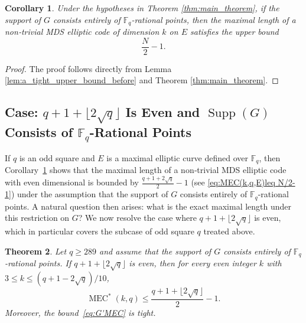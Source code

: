 \documentclass[journal,12pt,onecolumn]{IEEEtran}
\newtheorem{theorem}{Theorem}
\newtheorem{corollary}[theorem]{Corollary}
\begin{document}
\begin{corollary}\label{cor:evenE(Fq)}
    Under the hypotheses in Theorem \ref{thm:main_theorem}, if the support of $G$ consists entirely of $\mathbb{F}_q$-rational points, then the maximal length of a non‑trivial MDS elliptic code of dimension $k$ on $E$ satisfies the upper bound
    \begin{equation}\label{eq:MEC(k,q,E)leq N/2-1}
          \frac{N}{2} - 1.
    \end{equation}
\end{corollary}

\begin{proof}
    The proof follows directly from Lemma \ref{lem:a_tight_upper_bound_before} and Theorem \ref{thm:main_theorem}.
\end{proof}

\subsection{Case: $q+1+ \lfloor 2\sqrt{q} \rfloor$ Is Even and $\operatorname{Supp}(G)$ Consists of $\mathbb{F}_q$-Rational Points}


If $q$ is an odd square and $E$ is a maximal elliptic curve defined over $\mathbb{F}_q$, then Corollary~\ref{cor:evenE(Fq)} shows that the maximal length of a non‑trivial MDS elliptic code with even dimensional is bounded by $\frac{q+1+2\sqrt{q}}{2}-1$ (see \eqref{eq:MEC(k,q,E)leq N/2-1}) under the assumption that the support of $G$ consists entirely of $\mathbb{F}_q$-rational points. A natural question then arises: what is the exact maximal length under this restriction on $G$?
We now resolve the case where $q+1+ \lfloor 2\sqrt{q} \rfloor$ is even, which in particular covers the subcase of odd square $q$ treated above.
\begin{theorem}\label{thm:G'and_even_k}
Let $q \ge 289$ and assume that the support of $G$ consists entirely of $\mathbb{F}_q$-rational points. If $q+1+ \lfloor 2\sqrt{q} \rfloor$ is even, then for every even integer $k$ with $3 \le k \le (q + 1 - 2\sqrt{q})/10$, 
\begin{equation}\label{eq:G'MEC}
\operatorname{MEC}^*(k,q) \le \frac{q+1+ \lfloor 2\sqrt{q} \rfloor}{2} - 1.
\end{equation}
Moreover, the bound~\eqref{eq:G'MEC} is tight.
\end{theorem}
\end{document}

